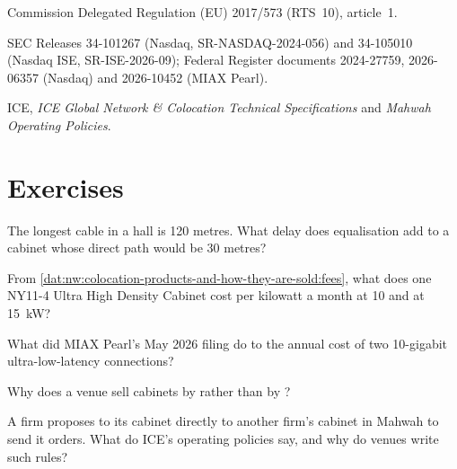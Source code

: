\begin{omsources}
\item Commission Delegated Regulation (EU) 2017/573 (RTS~10), article~1.
\item SEC Releases 34-101267 (Nasdaq, SR-NASDAQ-2024-056) and 34-105010 (Nasdaq ISE, SR-ISE-2026-09); Federal Register documents 2024-27759,
2026-06357 (Nasdaq) and 2026-10452 (MIAX Pearl).
\item ICE, \emph{ICE Global Network \& Colocation Technical Specifications} and \emph{Mahwah Operating Policies}.
\end{omsources}

\section{Exercises}

\begin{exercise}[$\star$]\label{exo:nw:colocation-products-and-how-they-are-sold:1}
The longest cable in a hall is 120 metres. What delay does equalisation add to a cabinet whose direct path would be 30 metres?
\end{exercise}

\begin{exercise}[$\star$]\label{exo:nw:colocation-products-and-how-they-are-sold:2}
From \cref{dat:nw:colocation-products-and-how-they-are-sold:fees}, what does one NY11-4 Ultra High Density Cabinet cost per kilowatt a month at
10 and at \qty{15}{\kilo\watt}?
\end{exercise}

\begin{exercise}[$\star$]\label{exo:nw:colocation-products-and-how-they-are-sold:3}
What did MIAX Pearl's May 2026 filing do to the annual cost of two 10-gigabit ultra-low-latency connections?
\end{exercise}

\begin{exercise}[$\star\star$]\label{exo:nw:colocation-products-and-how-they-are-sold:4}
Why does a venue sell cabinets by  rather than by ?
\end{exercise}

\begin{exercise}[$\star\star$]\label{exo:nw:colocation-products-and-how-they-are-sold:5}
A firm proposes to  its cabinet directly to another firm's cabinet in Mahwah to send it orders. What do ICE's operating
policies say, and why do venues write such rules?
\end{exercise}

